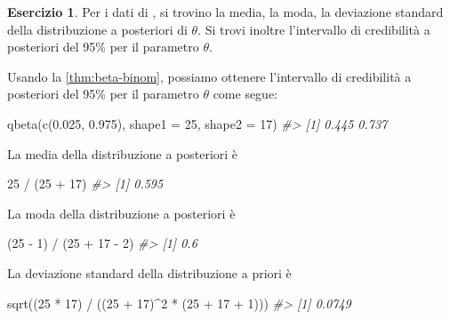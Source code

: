 \documentclass[
  10pt,
  italian,
  a4paper,
  extrafontsizes,onecolumn,openright
  ]{memoir}
\newenvironment{Shaded}{\begin{snugshade}}{\end{snugshade}}
\newcommand{\AttributeTok}[1]{\textcolor[rgb]{0.77,0.63,0.00}{#1}}
\newcommand{\CommentTok}[1]{\textcolor[rgb]{0.56,0.35,0.01}{\textit{#1}}}
\newcommand{\DecValTok}[1]{\textcolor[rgb]{0.00,0.00,0.81}{#1}}
\newcommand{\FloatTok}[1]{\textcolor[rgb]{0.00,0.00,0.81}{#1}}
\newcommand{\FunctionTok}[1]{\textcolor[rgb]{0.00,0.00,0.00}{#1}}
\newcommand{\NormalTok}[1]{#1}
\newcommand{\SpecialCharTok}[1]{\textcolor[rgb]{0.00,0.00,0.00}{#1}}
\theoremstyle{definition}
\theoremstyle{definition}
\theoremstyle{definition}
\newtheorem{exercise}{Esercizio}[chapter]
\theoremstyle{definition}
\theoremstyle{remark}
\begin{document}
\begin{exercise}

Per i dati di \textcite{zetschefuture2019}, si trovino la media, la moda, la deviazione standard della distribuzione a posteriori di \(\theta\). Si trovi inoltre l'intervallo di credibilità a posteriori del 95\% per il parametro \(\theta\).

Usando la \ref{thm:beta-binom}, possiamo ottenere l'intervallo di credibilità a posteriori del 95\% per il parametro \(\theta\) come segue:

\begin{Shaded}
\begin{Highlighting}[]
\FunctionTok{qbeta}\NormalTok{(}\FunctionTok{c}\NormalTok{(}\FloatTok{0.025}\NormalTok{, }\FloatTok{0.975}\NormalTok{), }\AttributeTok{shape1 =} \DecValTok{25}\NormalTok{, }\AttributeTok{shape2 =} \DecValTok{17}\NormalTok{)}
\CommentTok{\#\textgreater{} [1] 0.445 0.737}
\end{Highlighting}
\end{Shaded}

\noindent
La media della distribuzione a posteriori è

\begin{Shaded}
\begin{Highlighting}[]
\DecValTok{25} \SpecialCharTok{/}\NormalTok{ (}\DecValTok{25} \SpecialCharTok{+} \DecValTok{17}\NormalTok{)}
\CommentTok{\#\textgreater{} [1] 0.595}
\end{Highlighting}
\end{Shaded}

\noindent
La moda della distribuzione a posteriori è

\begin{Shaded}
\begin{Highlighting}[]
\NormalTok{(}\DecValTok{25} \SpecialCharTok{{-}} \DecValTok{1}\NormalTok{) }\SpecialCharTok{/}\NormalTok{ (}\DecValTok{25} \SpecialCharTok{+} \DecValTok{17} \SpecialCharTok{{-}} \DecValTok{2}\NormalTok{)}
\CommentTok{\#\textgreater{} [1] 0.6}
\end{Highlighting}
\end{Shaded}

\noindent
La deviazione standard della distribuzione a priori è

\begin{Shaded}
\begin{Highlighting}[]
\FunctionTok{sqrt}\NormalTok{((}\DecValTok{25} \SpecialCharTok{*} \DecValTok{17}\NormalTok{) }\SpecialCharTok{/}\NormalTok{ ((}\DecValTok{25} \SpecialCharTok{+} \DecValTok{17}\NormalTok{)}\SpecialCharTok{\^{}}\DecValTok{2} \SpecialCharTok{*}\NormalTok{ (}\DecValTok{25} \SpecialCharTok{+} \DecValTok{17} \SpecialCharTok{+} \DecValTok{1}\NormalTok{)))}
\CommentTok{\#\textgreater{} [1] 0.0749}
\end{Highlighting}
\end{Shaded}

\end{exercise}
\end{document}
